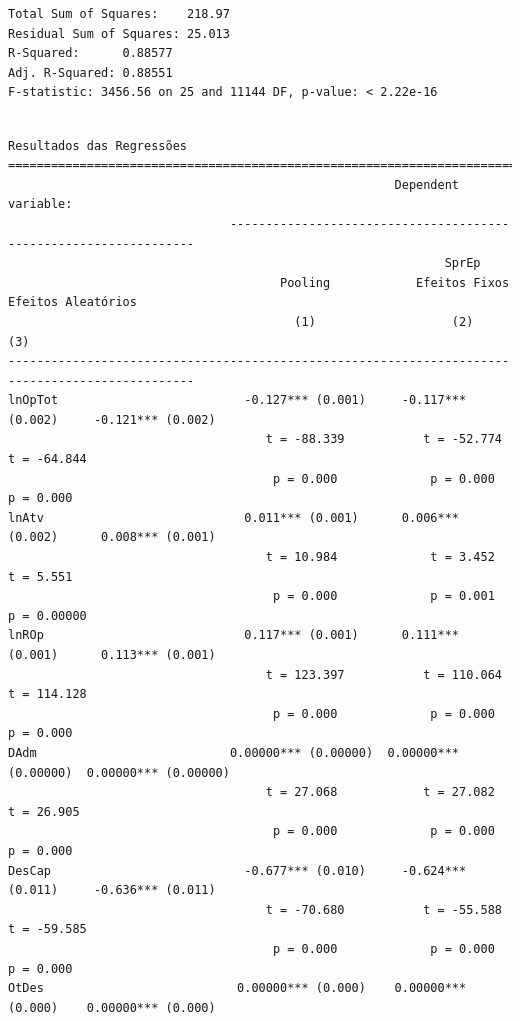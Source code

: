 \documentclass[12pt,12pt,openright,oneside,a4paper,chapter=TITLE,section=TITLE,subsection=TITLE,subsubsection=TITLE,english,french,spanish,portugues,sumario=tradicional]{abntex2}
\begin{document}
\begin{verbatim}
Total Sum of Squares:    218.97
Residual Sum of Squares: 25.013
R-Squared:      0.88577
Adj. R-Squared: 0.88551
F-statistic: 3456.56 on 25 and 11144 DF, p-value: < 2.22e-16
\end{verbatim}

\begin{verbatim}

Resultados das Regressões
================================================================================================
                                                      Dependent variable:                       
                               -----------------------------------------------------------------
                                                             SprEp                              
                                      Pooling            Efeitos Fixos      Efeitos Aleatórios  
                                        (1)                   (2)                   (3)         
------------------------------------------------------------------------------------------------
lnOpTot                          -0.127*** (0.001)     -0.117*** (0.002)     -0.121*** (0.002)  
                                    t = -88.339           t = -52.774           t = -64.844     
                                     p = 0.000             p = 0.000             p = 0.000      
lnAtv                            0.011*** (0.001)      0.006*** (0.002)      0.008*** (0.001)   
                                    t = 10.984             t = 3.452             t = 5.551      
                                     p = 0.000             p = 0.001            p = 0.00000     
lnROp                            0.117*** (0.001)      0.111*** (0.001)      0.113*** (0.001)   
                                    t = 123.397           t = 110.064           t = 114.128     
                                     p = 0.000             p = 0.000             p = 0.000      
DAdm                           0.00000*** (0.00000)  0.00000*** (0.00000)  0.00000*** (0.00000) 
                                    t = 27.068            t = 27.082            t = 26.905      
                                     p = 0.000             p = 0.000             p = 0.000      
DesCap                           -0.677*** (0.010)     -0.624*** (0.011)     -0.636*** (0.011)  
                                    t = -70.680           t = -55.588           t = -59.585     
                                     p = 0.000             p = 0.000             p = 0.000      
OtDes                           0.00000*** (0.000)    0.00000*** (0.000)    0.00000*** (0.000)  

\end{verbatim}
\end{document}

